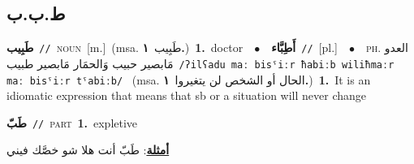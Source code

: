 \documentclass[10pt,a4paper,twoside]{article} %
\begin{document}
\begin{multicols}{2}
{\vspace{-3mm}
\subsection*{\color{blue}\foreignlanguage{arabic}{ط.ب.ب}\color{blue}{}} 

{\setlength\topsep{0pt}\textbf{\foreignlanguage{arabic}{طَبِيب}}\ {\color{gray}\texttt{//}\color{black}}\ \textsc{noun}\ [m.]\ \color{gray}(msa. \foreignlanguage{arabic}{طَبِيب}~\foreignlanguage{arabic}{\textbf{١.}})\color{black}\ \textbf{1.}~doctor\ \ $\bullet$\ \ \setlength\topsep{0pt}\textbf{\foreignlanguage{arabic}{أَطِبَّاء}}\ {\color{gray}\texttt{//}\color{black}}\ [pl.]\ \ $\bullet$\ \ \textsc{ph.} \color{gray} \foreignlanguage{arabic}{العدو مَابصير حبيب وَالحمَار مَابصير طبيب}\color{black}\ {\color{gray}\texttt{/{\sffamily ʔilʕadu maː bisˤiːr ħabiːb wiliħmaːr maː bisˤiːr tˤabiːb}/}\color{black}}\ \color{gray} (msa. \foreignlanguage{arabic}{الحال أو الشخص لن يتغيروا}~\foreignlanguage{arabic}{\textbf{١.}})\color{black}\ \textbf{1.}~It is an idiomatic expression that means that sb or a situation will never change\ 

{\setlength\topsep{0pt}\textbf{\foreignlanguage{arabic}{طَبّ}}\ {\color{gray}\texttt{//}\color{black}}\ \textsc{part}\ \textbf{1.}~expletive\  \begin{flushright}\color{gray}\foreignlanguage{arabic}{\textbf{\underline{\foreignlanguage{arabic}{أمثلة}}}: طَبّ أنت هلا شو خصَّك فيني}\end{flushright}\color{black}} \vspace{2mm}

}}
\end{multicols}
\end{document}
